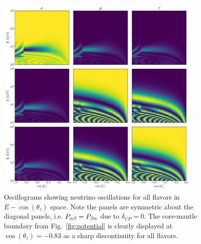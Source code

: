 \begin{figure}
    \centering
    \includegraphics[width=0.9\textwidth]{figures/oscillograms.pdf}
    \caption{Oscillograms showing neutrino oscillations for all flavors in $E - \cos(\theta_z)$ space. Note the panels are symmetric about the diagonal panels, i.e. $P_{\alpha\beta} = P_{\beta\alpha}$ due to $\delta_{CP} = 0$. The core-mantle boundary from Fig.~\ref{fig:potential} is clearly displayed at $\cos{(\theta_z)} = -0.83$ as a sharp discontinuity for all flavors.}\label{fig:oscillograms}%
\end{figure}%


% 
